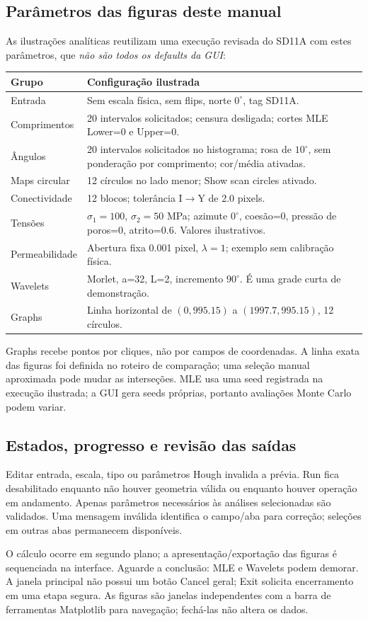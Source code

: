\subsection{Parâmetros das figuras deste manual}\label{sec:parametros}
As ilustrações analíticas reutilizam uma execução revisada do SD11A com estes parâmetros, que \emph{não são todos os defaults da GUI}:
\begin{longtable}{@{}p{.43\linewidth}p{.49\linewidth}@{}}
\toprule Grupo & Configuração ilustrada\\\midrule\endhead
Entrada & Sem escala física, sem flips, norte \(0^\circ\), tag SD11A.\\
Comprimentos & 20 intervalos solicitados; censura desligada; cortes MLE Lower=0 e Upper=0.\\
Ângulos & 20 intervalos solicitados no histograma; rosa de \(10^\circ\), sem ponderação por comprimento; cor/média ativadas.\\
Maps circular & 12 círculos no lado menor; Show scan circles ativado.\\
Conectividade & 12 blocos; tolerância I\(\to\)Y de 2.0 pixels.\\
Tensões & \(\sigma_1=100\), \(\sigma_2=50\) MPa; azimute \(0^\circ\), coesão=0, pressão de poros=0, atrito=0.6. Valores ilustrativos.\\
Permeabilidade & Abertura fixa 0.001 pixel, \(\lambda=1\); exemplo sem calibração física.\\
Wavelets & Morlet, a=32, L=2, incremento \(90^\circ\). É uma grade curta de demonstração.\\
Graphs & Linha horizontal de \((0,995.15)\) a \((1997.7,995.15)\), 12 círculos.\\\bottomrule
\end{longtable}
Graphs recebe pontos por cliques, não por campos de coordenadas. A linha exata das figuras foi definida no roteiro de comparação; uma seleção manual aproximada pode mudar as interseções. MLE usa uma seed registrada na execução ilustrada; a GUI gera seeds próprias, portanto avaliações Monte Carlo podem variar.

\subsection{Estados, progresso e revisão das saídas}
Editar entrada, escala, tipo ou parâmetros Hough invalida a prévia. Run fica desabilitado enquanto não houver geometria válida ou enquanto houver operação em andamento. Apenas parâmetros necessários às análises selecionadas são validados. Uma mensagem inválida identifica o campo/aba para correção; seleções em outras abas permanecem disponíveis.

O cálculo ocorre em segundo plano; a apresentação/exportação das figuras é sequenciada na interface. Aguarde a conclusão: MLE e Wavelets podem demorar. A janela principal não possui um botão Cancel geral; Exit solicita encerramento em uma etapa segura. As figuras são janelas independentes com a barra de ferramentas Matplotlib para navegação; fechá-las não altera os dados.
